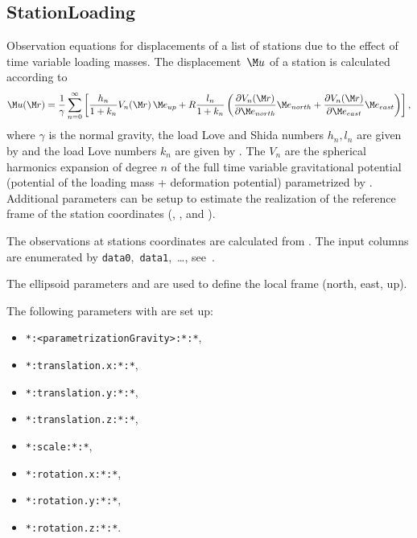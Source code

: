 \subsection{StationLoading}\label{observationType:stationLoading}
Observation equations for displacements of a list of stations
due to the effect of time variable loading masses. The displacement~$\M u$ of a station is calculated according to
\begin{equation}
\M u(\M r) = \frac{1}{\gamma}\sum_{n=0}^\infty \left[\frac{h_n}{1+k_n}V_n(\M r)\,\M e_{up}
+ R\frac{l_n}{1+k_n}\left(
 \frac{\partial V_n(\M r)}{\partial \M e_{north}}\M e_{north}
+\frac{\partial V_n(\M r)}{\partial \M e_{east}} \M e_{east}\right)\right],
\end{equation}
where $\gamma$ is the normal gravity, the load Love and Shida numbers $h_n,l_n$ are given by
 and the load Love numbers $k_n$ are given by
.
The $V_n$ are the spherical harmonics expansion of degree $n$ of the full time variable
gravitational potential (potential of the loading mass + deformation potential)
parametrized by .
Additional parameters can be setup to estimate the realization of the reference frame
of the station coordinates (,
, and ).

The observations at stations coordinates are calculated from
.
The input columns are enumerated by \verb|data0|,~\verb|data1|,~\ldots,
see~.

The ellipsoid parameters  and  are used
to define the local frame (north, east, up).

The following parameters with  are set up:
\begin{itemize}
\item \verb|*:<parametrizationGravity>:*:*|,
\item \verb|*:translation.x:*:*|,
\item \verb|*:translation.y:*:*|,
\item \verb|*:translation.z:*:*|,
\item \verb|*:scale:*:*|,
\item \verb|*:rotation.x:*:*|,
\item \verb|*:rotation.y:*:*|,
\item \verb|*:rotation.z:*:*|.
\end{itemize}

